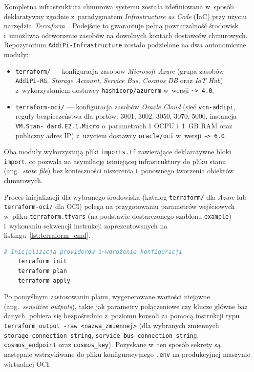 \documentclass[a4paper,12pt,reqno]{article}
\begin{document}
Kompletna infrastruktura chmurowa systemu została zdefiniowana w~sposób deklaratywny zgodnie z~paradygmatem \textit{Infrastructure as Code} (IaC) przy użyciu narzędzia \textit{Terraform}~\cite{terraform}. Podejście to gwarantuje pełną powtarzalność środowisk i~umożliwia odtworzenie zasobów na dowolnych kontach dostawców chmurowych. Repozytorium \texttt{AddiPi-Infrastructure} zostało podzielone na dwa autonomiczne moduły:
\begin{itemize}
	\item \texttt{terraform/} --- konfiguracja zasobów \textit{Microsoft Azure} (grupa zasobów \texttt{AddiPi-RG}, \textit{Storage Account}, \textit{Service Bus}, \textit{Cosmos DB} oraz \textit{IoT Hub}) z~wykorzystaniem dostawcy \texttt{hashicorp/azurerm} w~wersji \texttt{\textasciitilde{}> 4.0},
	\item \texttt{terraform-oci/} --- konfiguracja zasobów \textit{Oracle Cloud} (sieć \texttt{vcn-addipi}, reguły bezpieczeństwa dla portów: 3001, 3002, 3050, 3070, 5000, instancja \texttt{VM.Stan- dard.E2.1.Micro} o~parametrach 1 OCPU i~1~GB RAM oraz publiczny adres IP) z~użyciem dostawcy \texttt{oracle/oci} w~wersji \texttt{\textasciitilde{}> 6.0}.
\end{itemize}
Oba moduły wykorzystują pliki \texttt{imports.tf} zawierające deklaratywne bloki \texttt{import}, co pozwala na asymilację istniejącej infrastruktury do pliku stanu (ang.~\textit{state file}) bez konieczności niszczenia i~ponownego tworzenia obiektów chmurowych.

Proces inicjalizacji dla wybranego środowiska (katalog \texttt{terraform/} dla \textit{Azure} lub \texttt{terraform-oci/} dla OCI) polega na przygotowaniu parametrów wejściowych w~pliku \texttt{terraform.tfvars} (na podstawie dostarczonego szablonu \texttt{example}) i~wykonaniu sekwencji instrukcji zaprezentowanych na listingu~\ref{lst:terraform_cmd}.

\begin{lstlisting}[language=bash,caption={Inicjalizacja i~aplikacja planu infrastruktury przez Terraform~\cite{terraform}.},style=plListing,label={lst:terraform_cmd}]
	# Inicjalizacja providerów i~wdrożenie konfiguracji
	terraform init
	terraform plan
	terraform apply
\end{lstlisting}

\noindent Po pomyślnym zastosowaniu planu, wygenerowane wartości niejawne (ang.~\textit{sensitive outputs}), takie jak parametry połączeniowe czy klucze główne baz danych, pobiera się bezpośrednio z~poziomu konsoli za pomocą instrukcji typu \texttt{terraform output -raw <nazwa\_zmiennej>} (dla wybranych zmiennych \texttt{storage\_connection\_string}, \texttt{service\_bus\_connection\_string}, \texttt{cosmos\_endpoint} oraz \texttt{cosmos\_key}). Pozyskane w~ten sposób sekrety są następnie wstrzykiwane do pliku konfiguracyjnego \texttt{.env} na produkcyjnej maszynie wirtualnej OCI.
\end{document}
